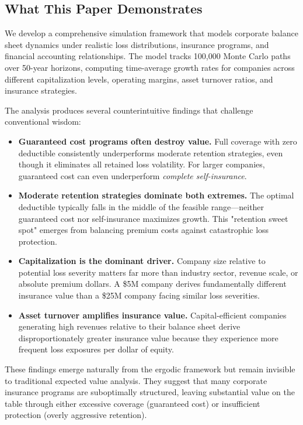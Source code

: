 \documentclass[11pt,letterpaper]{article}
\begin{document}
\subsection{What This Paper Demonstrates}

We develop a comprehensive simulation framework that models corporate balance sheet dynamics under realistic loss distributions, insurance programs, and financial accounting relationships. The model tracks 100,000 Monte Carlo paths over 50-year horizons, computing time-average growth rates for companies across different capitalization levels, operating margins, asset turnover ratios, and insurance strategies.

The analysis produces several counterintuitive findings that challenge conventional wisdom:

\begin{itemize}
    \item \textbf{Guaranteed cost programs often destroy value.} Full coverage with zero deductible consistently underperforms moderate retention strategies, even though it eliminates all retained loss volatility. For larger companies, guaranteed cost can even underperform \emph{complete self-insurance}.

    \item \textbf{Moderate retention strategies dominate both extremes.} The optimal deductible typically falls in the middle of the feasible range—neither guaranteed cost nor self-insurance maximizes growth. This "retention sweet spot" emerges from balancing premium costs against catastrophic loss protection.

    \item \textbf{Capitalization is the dominant driver.} Company size relative to potential loss severity matters far more than industry sector, revenue scale, or absolute premium dollars. A \$5M company derives fundamentally different insurance value than a \$25M company facing similar loss severities.

    \item \textbf{Asset turnover amplifies insurance value.} Capital-efficient companies generating high revenues relative to their balance sheet derive disproportionately greater insurance value because they experience more frequent loss exposures per dollar of equity.
\end{itemize}

These findings emerge naturally from the ergodic framework but remain invisible to traditional expected value analysis. They suggest that many corporate insurance programs are suboptimally structured, leaving substantial value on the table through either excessive coverage (guaranteed cost) or insufficient protection (overly aggressive retention).
\end{document}
